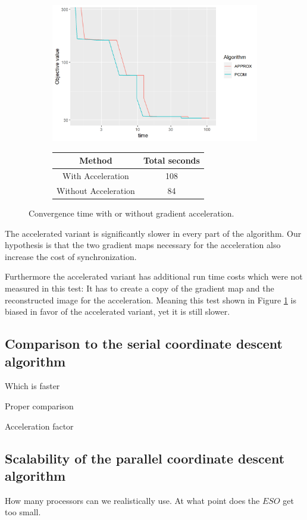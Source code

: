 \begin{figure}[h]
	\centering
	\begin{subfigure}{0.6\linewidth}
		\includegraphics[width=1.0\linewidth]{./chapters/05.pcdm/parameters/acceleration.png}
	\end{subfigure}
	\begin{subfigure}{0.35\linewidth}
		\begin{tabular}{c | c}
			Method & Total seconds \\ \hline
			With Acceleration & 108 \\
			Without Acceleration & 84 \\
		\end{tabular}
	\end{subfigure}
	\caption{Convergence time with or without gradient acceleration.}
	\label{pcdm:results:acc}
\end{figure}

The accelerated variant is significantly slower in every part of the algorithm. Our hypothesis is that the two gradient maps necessary for the acceleration also increase the cost of synchronization.

Furthermore the accelerated variant has additional run time costs which were not measured in this test: It has to create a copy of the gradient map and the reconstructed image for the acceleration. Meaning this test shown in Figure \ref{pcdm:results:acc} is biased in favor of the accelerated variant, yet it is still slower.


\subsection{Comparison to the serial coordinate descent algorithm}
Which is faster

Proper comparison

Acceleration factor


\subsection{Scalability of the parallel coordinate descent algorithm}
How many processors can we realistically use. At what point does the $ESO$ get too small.




